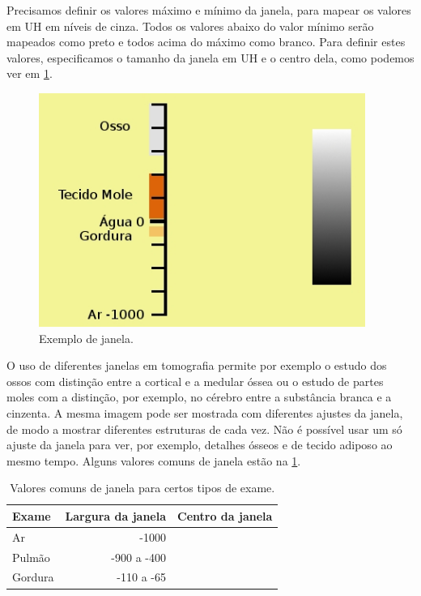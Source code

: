 Precisamos definir os valores máximo e mínimo da janela, para mapear os valores em UH em níveis de cinza. Todos os valores abaixo do valor mínimo serão mapeados como preto e todos acima do máximo como branco. Para definir estes valores, especificamos o tamanho da janela em UH e o centro dela, como podemos ver em \ref{fig:tc_janela}.

\begin{figure}[ht]
 \begin{center}
  \includegraphics[height=3.0in]{imagens/tc_janela.jpg}
 \end{center}
 \caption{Exemplo de janela.}
 \label{fig:tc_janela}
\end{figure}

O uso de diferentes janelas em tomografia permite por exemplo o estudo dos ossos com distinção entre a cortical e a medular óssea ou o estudo de partes moles com a distinção, por exemplo, no cérebro entre a substância branca e a cinzenta. A mesma imagem pode ser mostrada com diferentes ajustes da janela, de modo a mostrar diferentes estruturas de cada vez. Não é possível usar um só ajuste da janela para ver, por exemplo, detalhes ósseos e de tecido adiposo ao mesmo tempo. Alguns valores comuns de janela estão na \ref{tab:janela}.

\begin{table}
 \label{tab:janela}
 \caption{Valores comuns de janela para certos tipos de exame.}
 \begin{center}
 \begin{tabular}{|l|r|r|}
 \hline
 	\textbf{Exame} & \textbf{Largura da janela} & \textbf{Centro da janela} \\ \hline
 	Ar & -1000 \\ \hline
 	Pulmão & -900 a -400 \\ \hline
 	Gordura & -110 a -65 \\
 \hline
 \end{tabular}
 \end{center}
\end{table}

